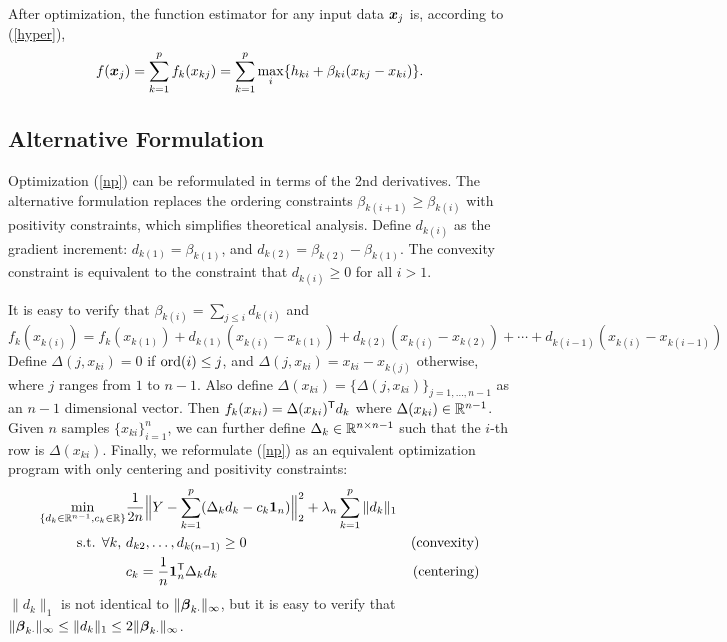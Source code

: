 After optimization, the function estimator for any input data $\boldsymbol{x}_j$ is, according to (\ref{hyper}),
\begin{equation}\nonumber
      f(\boldsymbol{x}_j) = \sum_{k=1}^{p}f_k(x_{kj}) = \sum_{k=1}^{p}\max_{i} \{h_{ki}+\beta_{ki}(x_{kj}-x_{ki})\}.
\end{equation} 


\def\hat#1{#1} 

\subsection{Alternative Formulation}
Optimization (\ref{np}) can be reformulated in terms of the 2nd derivatives. The alternative formulation replaces the ordering
constraints $\beta_{k(i+1)} \geq \beta_{k(i)}$ with positivity
constraints, which simplifies theoretical analysis.
Define $\hat{d}_{k(i)}$ as the gradient increment:
$\hat{d}_{k(1)} = \hat{\beta}_{k(1)}$, and $\hat{d}_{k(2)} =
\hat{\beta}_{k(2)} - \hat{\beta}_{k(1)}$. The convexity constraint is
equivalent to the constraint that $\hat{d}_{k(i)} \geq 0$ for all $i >
1$.

It is easy to verify that $\hat{\beta}_{k(i)} = \sum_{j \leq i} \hat{d}_{k(i)}$ and 
\[
\hat{f}_k(x_{k(i)}) = \hat{f}_k({x_{k(1)}}) +\hat{d}_{k(1)} ( x_{k(i)}
- x_{k(1)}) + \hat{d}_{k(2)} ( x_{k(i)} - x_{k(2)}) + \cdots + \hat{d}_{k(i-1)} ( x_{k(i)} - x_{k(i-1)})
\]
Define $\Delta(j, x_{ki}) = 0$ if $\textrm{ord}(i) \leq j$, and
$\Delta(j,x_{ki})= x_{ki} -
x_{k(j)}$ otherwise, where $j$ ranges from $1$ to $n-1$.  Also define
$\Delta(x_{ki}) = \{ \Delta(j, x_{ki}) \}_{j=1, \ldots ,n-1}$ as an
$n-1$ dimensional vector. Then $\hat{f}_k(x_{ki}) = \Delta(x_{ki})^\tran \hat{d}_{k}$ where $\Delta(x_{ki}) \in {\mathbb R}^{n-1}$. Given $n$ samples $\{x_{ki}\}_{i=1}^n$, we can further define $\Delta_k \in {\mathbb R}^{n \times n-1}$ such that the $i$-th row is $\Delta(x_{ki})$. Finally, we reformulate (\ref{np}) as an equivalent optimization program with only centering and positivity constraints:
\begin{align}
\min_{\{d_k \in {\mathbb R}^{n-1}, c_k \in {\mathbb R}\}}& \frac{1}{2n} \Bigl\| Y - \sum_{k=1}^p ( \Delta_k d_k - c_k \mbox{\boldmath $1$}_n) \Bigr\|_2^2 + \lambda_n \sum_{k=1}^p \|d_k\|_1  & \label{opt:alternate_opt} \\
\textrm{s.t. $\forall k$, }  & d_{k2}, \ldots , d_{k(n-1)} \geq 0 	\qquad &\textrm{(convexity)} \nonumber \\ 
	& c_k = \frac{1}{n} \mbox{\boldmath $1$}_n^{\mathsf{T}} \Delta_k d_k 	\qquad &\textrm{(centering)} \nonumber 
\end{align}
$\|d_k\|_1$ is not identical to $\|\boldsymbol{\beta}_{k\cdot}\|_{\infty}$, but it is easy to verify that $\|\boldsymbol{\beta}_{k\cdot}\|_{\infty} \leq \|d_k\|_1 \leq 2\|\boldsymbol{\beta}_{k\cdot}\|_{\infty}$.

